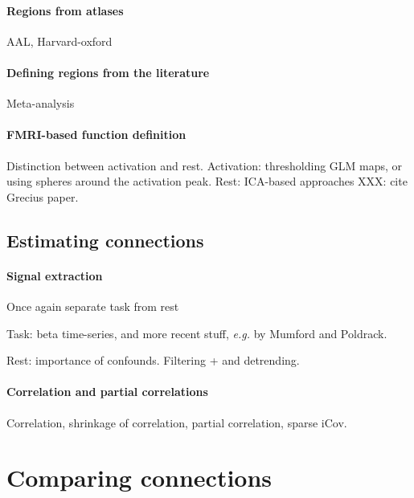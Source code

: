\documentclass[5p]{elsarticle}
\begin{document}
\paragraph{Regions from atlases}

AAL, Harvard-oxford

\paragraph{Defining regions from the literature}
Meta-analysis

\paragraph{FMRI-based function definition}
Distinction between activation and rest.
Activation: thresholding GLM maps, or using spheres around the activation
peak.
Rest: ICA-based approaches \cite{kiviniemi2009} XXX: cite Grecius paper.
\cite{varoquaux2011}

\subsection{Estimating connections}


\paragraph{Signal extraction}

Once again separate task from rest

Task: beta time-series, and more recent stuff, \emph{e.g.} by Mumford and
Poldrack.

Rest: importance of confounds. Filtering + and detrending.

\paragraph{Correlation and partial correlations}

Correlation, shrinkage of correlation, partial correlation, sparse iCov.


\section{Comparing connections}
\end{document}

